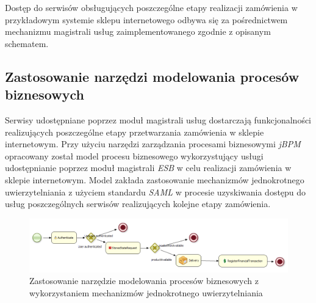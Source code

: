 	Dostęp do serwisów obsługujących poszczególne etapy realizacji zamówienia w przykładowym systemie sklepu internetowego odbywa się za pośrednictwem mechanizmu magistrali usług zaimplementowanego zgodnie z opisanym schematem. 
	
\subsection{Zastosowanie narzędzi modelowania procesów biznesowych}	

	Serwisy udostępniane poprzez moduł magistrali usług dostarczają funkcjonalności realizujących poszczególne etapy przetwarzania zamówienia w sklepie internetowym. Przy użyciu narzędzi  zarządzania procesami biznesowymi \textit{jBPM} opracowany został model procesu biznesowego wykorzystujący usługi udostępnianie poprzez moduł magistrali \textit{ESB} w celu realizacji zamówienia w sklepie internetowym. Model zakłada zastosowanie mechanizmów jednokrotnego uwierzytelniania z użyciem standardu \textit{SAML} w procesie uzyskiwania dostępu do usług poszczególnych serwisów realizujących kolejne etapy zamówienia. 

	\begin{figure}[h]
		\centering
		\includegraphics{img/jbpm_order_process.png}
		\caption{Zastosowanie narzędzie modelowania procesów biznesowych z wykorzystaniem mechanizmów jednokrotnego uwierzytelniania}
		\label{jBPM process}
	\end{figure}

